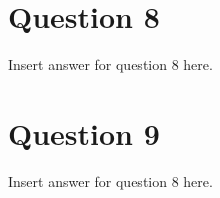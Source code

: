 \documentclass{article}
\begin{document}
    \section*{Question 8}
    Insert answer for question 8 here.
    \section*{Question 9}
    Insert answer for question 8 here.
       
\end{document}
